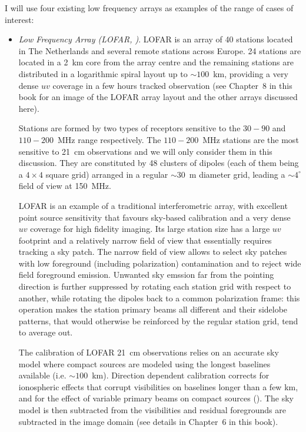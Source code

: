 {I will use four existing low frequency arrays as examples of the range of cases of interest:
\begin{itemize}

\item {\it Low Frequency Array (LOFAR, \cite{vanhaarlem13})}. LOFAR is an array of 40 stations located in The Netherlands and several remote stations across Europe. 24 stations are located in a 2~km core from the array centre and the remaining stations are distributed in a logarithmic spiral layout up to $\sim 100$~km, providing a very dense $uv$ coverage in a few hours tracked observation (see Chapter~8 in this book for an image of the LOFAR array layout and the other arrays discussed here).

Stations are formed by two types of receptors sensitive to the $30-90$ and $110-200$~MHz range respectively. The $110-200$~MHz stations are the most sensitive to 21~cm observations and we will only consider them in this discussion. They are constituted by 48 clusters of dipoles (each of them being a $4 \times 4$ square grid) arranged in a regular $\sim 30$~m diameter grid, leading a $\sim 4^\circ$ field of view at 150~MHz.

LOFAR is an example of a traditional interferometric array, with excellent point source sensitivity that favours sky-based calibration and a very dense $uv$ coverage for high fidelity imaging. Its large station size has a large $uv$ footprint and a relatively narrow field of view that essentially requires tracking a sky patch. The narrow field of view allows to select sky patches with low foreground (including polarization) contamination and to reject wide field foreground emission. Unwanted sky emssion far from the pointing direction is further suppressed by rotating each station grid with respect to another, while rotating the dipoles back to a common polarization frame: this operation makes the station primary beams all different and their sidelobe patterns, that would otherwise be reinforced by the regular station grid, tend to average out.

The calibration of LOFAR 21~cm observations relies on an accurate sky model where compact sources are modeled using the longest baselines available (i.e. $\sim 100$~km). Direction dependent calibration corrects for ionospheric effects that corrupt visibilities on baselines longer than a few km, and for the effect of variable primary beams on compact sources (\cite{yatawatta13}). The sky model is then subtracted from the visibilities and residual foregrounds are subtracted in the image domain (see details in Chapter~6 in this book). 


\end{itemize}}
